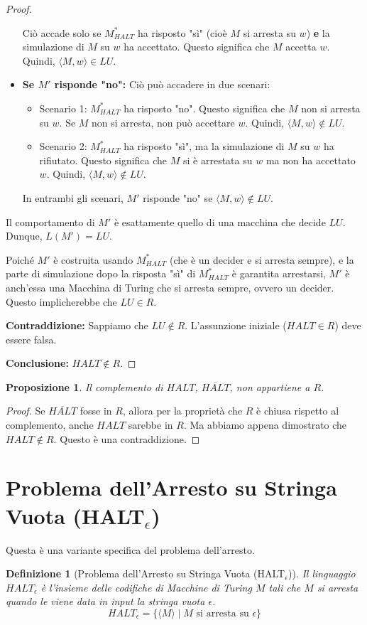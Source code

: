 \documentclass[a4paper, 11pt]{book} %
\newtheorem{definition}[theorem]{Definizione}
\newtheorem{proposition}[theorem]{Proposizione}
\theoremstyle{definition}
\begin{document}
\begin{proof}
\begin{itemize}
    Ciò accade solo se $M_{HALT}^*$ ha risposto "sì" (cioè $M$ si arresta su $w$) \textbf{e} la simulazione di $M$ su $w$ ha accettato.
    Questo significa che $M$ accetta $w$. Quindi, $\langle M, w \rangle \in LU$.
    \item \textbf{Se $M'$ risponde "no":}
    Ciò può accadere in due scenari:
    \begin{itemize}
        \item Scenario 1: $M_{HALT}^*$ ha risposto "no". Questo significa che $M$ non si arresta su $w$. Se $M$ non si arresta, non può accettare $w$. Quindi, $\langle M, w \rangle \notin LU$.
        \item Scenario 2: $M_{HALT}^*$ ha risposto "sì", ma la simulazione di $M$ su $w$ ha rifiutato. Questo significa che $M$ si è arrestata su $w$ ma non ha accettato $w$. Quindi, $\langle M, w \rangle \notin LU$.
    \end{itemize}
    In entrambi gli scenari, $M'$ risponde "no" se $\langle M, w \rangle \notin LU$.
\end{itemize}
Il comportamento di $M'$ è esattamente quello di una macchina che decide $LU$. Dunque, $L(M') = LU$.

Poiché $M'$ è costruita usando $M_{HALT}^*$ (che è un decider e si arresta sempre), e la parte di simulazione dopo la risposta "sì" di $M_{HALT}^*$ è garantita arrestarsi, $M'$ è anch'essa una Macchina di Turing che si arresta sempre, ovvero un decider.
Questo implicherebbe che $LU \in R$.

\textbf{Contraddizione:} Sappiamo che $LU \notin R$.
L'assunzione iniziale ($HALT \in R$) deve essere falsa.

\textbf{Conclusione:} $HALT \notin R$.
\end{proof}

\begin{proposition}
Il complemento di $HALT$, $\overline{HALT}$, non appartiene a $R$.
\end{proposition}
\begin{proof}
Se $\overline{HALT}$ fosse in $R$, allora per la proprietà che $R$ è chiusa rispetto al complemento, anche $HALT$ sarebbe in $R$. Ma abbiamo appena dimostrato che $HALT \notin R$. Questo è una contraddizione.
\end{proof}

\section{Problema dell'Arresto su Stringa Vuota (HALT$_\epsilon$)}
Questa è una variante specifica del problema dell'arresto.
\begin{definition}[Problema dell'Arresto su Stringa Vuota (HALT$_\epsilon$)]
Il linguaggio $HALT_\epsilon$ è l'insieme delle codifiche di Macchine di Turing $M$ tali che $M$ si arresta quando le viene data in input la stringa vuota $\epsilon$.
\[ HALT_\epsilon = \{ \langle M \rangle \mid M \text{ si arresta su } \epsilon \} \]
\end{definition}
\end{document}
